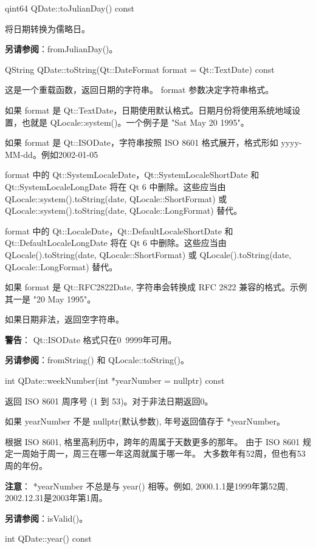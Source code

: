 qint64 QDate::toJulianDay() const

将日期转换为儒略日。

\textbf{另请参阅}：fromJulianDay()。

\splitLine

QString QDate::toString(Qt::DateFormat format = Qt::TextDate) const

这是一个重载函数，返回日期的字符串。 format 参数决定字符串格式。

如果 format 是 Qt::TextDate，日期使用默认格式。日期月份将使用系统地域设置，也就是 QLocale::system()。一个例子是 "Sat May 20 1995"。

如果 format 是 Qt::ISODate，字符串按照 ISO 8601 格式展开，格式形如 yyyy-MM-dd。例如2002-01-05

format 中的 Qt::SystemLocaleDate，Qt::SystemLocaleShortDate 和Qt::SystemLocaleLongDate 将在 Qt 6 中删除。这些应当由 QLocale::system().toString(date, QLocale::ShortFormat) 或 QLocale::system().toString(date, QLocale::LongFormat) 替代。

format 中的 Qt::LocaleDate，Qt::DefaultLocaleShortDate 和Qt::DefaultLocaleLongDate 将在 Qt 6 中删除。这些应当由 QLocale().toString(date, QLocale::ShortFormat) 或 QLocale().toString(date, QLocale::LongFormat) 替代。

如果 format 是 Qt::RFC2822Date, 字符串会转换成 RFC 2822 兼容的格式。示例其一是 "20 May 1995"。

如果日期非法，返回空字符串。

\textbf{警告}： Qt::ISODate 格式只在0~9999年可用。

\textbf{另请参阅}：fromString() 和 QLocale::toString()。

\splitLine

int QDate::weekNumber(int *yearNumber = nullptr) const

返回 ISO 8601 周序号 (1 到 53)。对于非法日期返回0。

如果 yearNumber 不是 nullptr(默认参数), 年号返回值存于 *yearNumber。

根据 ISO 8601, 格里高利历中，跨年的周属于天数更多的那年。 由于 ISO 8601 规定一周始于周一，周三在哪一年这周就属于哪一年。 大多数年有52周，但也有53周的年份。

\textbf{注意}： *yearNumber 不总是与 year() 相等。例如, 2000.1.1是1999年第52周, 2002.12.31是2003年第1周。

\textbf{另请参阅}：isValid()。

\splitLine

int QDate::year() const

